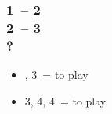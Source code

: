\documentclass[12pt, a4paper]{article}
\begin{document}
\subsubsection*{1\ntx\ -- 2\hearts \\
                2\spades\ -- 3\hearts \\
                ?}
\begin{itemize}
    \item \pass, 3\spades\ = to play
    \item 3\nt, 4\hearts, 4\spades\ = to play
\end{itemize}

\end{document}
